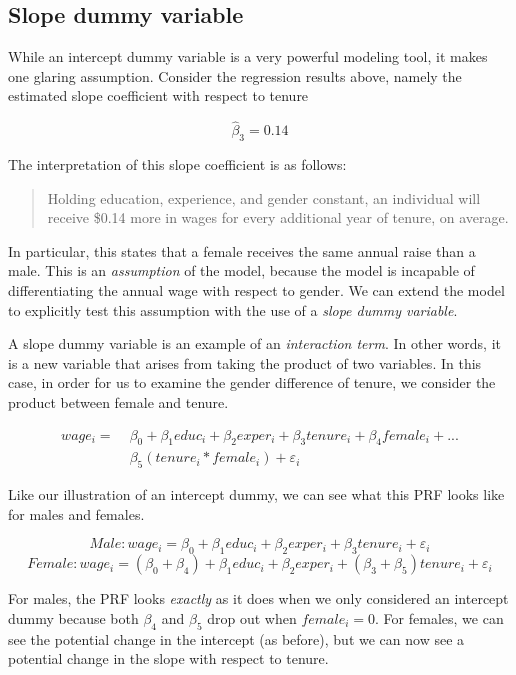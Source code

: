 \documentclass[
]{book}
\begin{document}
\hypertarget{slope-dummy-variable}{%
\subsection{Slope dummy variable}\label{slope-dummy-variable}}

While an intercept dummy variable is a very powerful modeling tool, it makes one glaring assumption. Consider the regression results above, namely the estimated slope coefficient with respect to tenure

\[\hat{\beta}_3 = 0.14\]

The interpretation of this slope coefficient is as follows:

\begin{quote}
Holding education, experience, and gender constant, an individual will receive \$0.14 more in wages for every additional year of tenure, on average.
\end{quote}

In particular, this states that a female receives the same annual raise than a male. This is an \emph{assumption} of the model, because the model is incapable of differentiating the annual wage with respect to gender. We can extend the model to explicitly test this assumption with the use of a \emph{slope dummy variable}.

A slope dummy variable is an example of an \emph{interaction term}. In other words, it is a new variable that arises from taking the product of two variables. In this case, in order for us to examine the gender difference of tenure, we consider the product between female and tenure.

\[\begin{aligned}
wage_i = \;&\beta_0+\beta_1educ_i+\beta_2exper_i+ \beta_3tenure_i+\beta_4female_i+... \\ &\beta_5(tenure_i*female_i)+\varepsilon_i 
\end{aligned}\]

Like our illustration of an intercept dummy, we can see what this PRF looks like for males and females.

\[Male: wage_i=\beta_0+\beta_1educ_i+\beta_2exper_i+\beta_3tenure_i+\varepsilon_i\]
\[Female: wage_i=(\beta_0+\beta_4)+\beta_1educ_i+\beta_2exper_i+(\beta_3+\beta_5)tenure_i+\varepsilon_i\]

For males, the PRF looks \emph{exactly} as it does when we only considered an intercept dummy because both \(\beta_4\) and \(\beta_5\) drop out when \(female_i = 0\). For females, we can see the potential change in the intercept (as before), but we can now see a potential change in the slope with respect to tenure.
\end{document}
